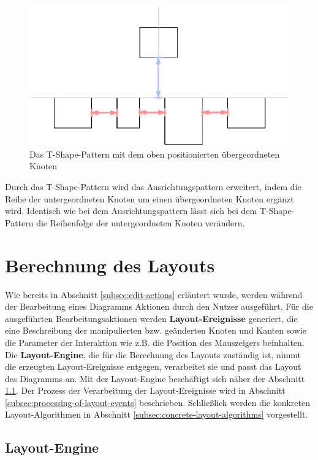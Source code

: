 \begin{figure}[hbt]
    \centering
    \includegraphics{resources/layout-pattern-t-shape}
    \caption{Das T-Shape-Pattern mit dem oben positionierten übergeordneten Knoten}
    \label{fig:layout-pattern-t-shape}
\end{figure}

Durch das T-Shape-Pattern wird das Ausrichtungspattern erweitert, indem die Reihe der untergeordneten Knoten um einen übergeordneten Knoten ergänzt wird. Identisch wie bei dem Ausrichtungspattern lässt sich bei dem T-Shape-Pattern die Reihenfolge der untergeordneten Knoten verändern.

\section{Berechnung des Layouts}
\label{sec:layout-calculation}

Wie bereits in Abschnitt \ref{subsec:edit-actions} erläutert wurde, werden während der Bearbeitung eines Diagramms Aktionen durch den Nutzer ausgeführt. Für die ausgeführten Bearbeitungsaktionen werden \textbf{Layout-Ereignisse} generiert, die eine Beschreibung der manipulierten bzw. geänderten Knoten und Kanten sowie die Parameter der Interaktion wie z.B. die Position des Mauszeigers beinhalten. Die \textbf{Layout-Engine}, die für die Berechnung des Layouts zuständig ist, nimmt die erzeugten Layout-Ereignisse entgegen, verarbeitet sie und passt das Layout des Diagramms an. Mit der Layout-Engine beschäftigt sich näher der Abschnitt \ref{subsec:layout-engine}. Der Prozess der Verarbeitung der Layout-Ereignisse wird in Abschnitt \ref{subsec:processing-of-layout-events} beschrieben. Schließlich werden die konkreten Layout-Algorithmen in Abschnitt \ref{subsec:concrete-layout-algorithms} vorgestellt.

\subsection{Layout-Engine}
\label{subsec:layout-engine}

